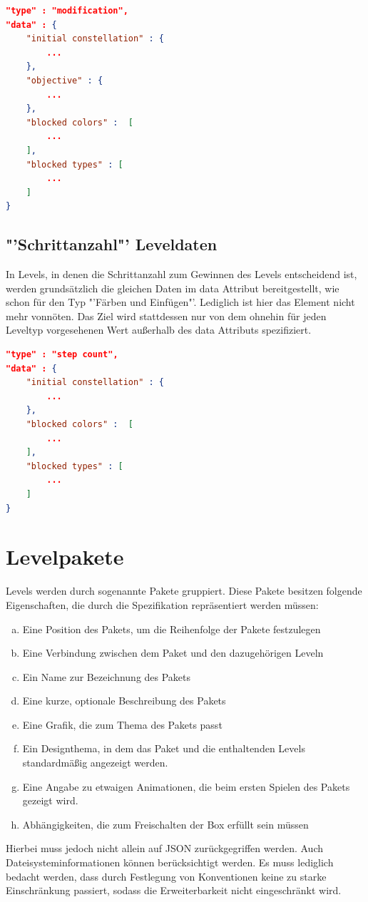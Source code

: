 \begin{lstlisting}[language=json,caption={Grober Aufbau des data Attributs eines "'Färben und Einfügen"' Levels}]
"type" : "modification",
"data" : {
	"initial constellation" : {
		...
	},
	"objective" : {
		...
	},
	"blocked colors" :  [
		...
	],
	"blocked types" : [
		...
	]
}
\end{lstlisting}

\subsection{"'Schrittanzahl"' Leveldaten}
In Levels, in denen die Schrittanzahl zum Gewinnen des Levels entscheidend ist, werden grundsätzlich die gleichen Daten im data Attribut bereitgestellt, wie schon für den Typ "'Färben und Einfügen"'.
Lediglich ist hier das Element  nicht mehr vonnöten.
Das Ziel wird stattdessen nur von dem ohnehin für jeden Leveltyp vorgesehenen Wert  außerhalb des data Attributs spezifiziert.

\begin{lstlisting}[language=json,caption={Grober Aufbau des data Attributs eines "'Schrittzahl"' Levels}]
"type" : "step count",
"data" : {
	"initial constellation" : {
		...
	},
	"blocked colors" :  [
		...
	],
	"blocked types" : [
		...
	]
}
\end{lstlisting}

\section{Levelpakete}
Levels werden durch sogenannte Pakete gruppiert.
Diese Pakete besitzen folgende Eigenschaften, die durch die Spezifikation repräsentiert werden müssen:
\begin{enumerate}[a)]
	\item Eine Position des Pakets, um die Reihenfolge der Pakete festzulegen
	\item Eine Verbindung zwischen dem Paket und den dazugehörigen Leveln
	\item Ein Name zur Bezeichnung des Pakets
	\item Eine kurze, optionale Beschreibung des Pakets
	\item Eine Grafik, die zum Thema des Pakets passt
	\item Ein Designthema, in dem das Paket und die enthaltenden Levels standardmäßig angezeigt werden.
	\item Eine Angabe zu etwaigen Animationen, die beim ersten Spielen des Pakets gezeigt wird.
	\item Abhängigkeiten, die zum Freischalten der Box erfüllt sein müssen
\end{enumerate}
Hierbei muss jedoch nicht allein auf JSON zurückgegriffen werden.
Auch Dateisysteminformationen können berücksichtigt werden.
Es muss lediglich bedacht werden, dass durch Festlegung von Konventionen keine zu starke Einschränkung passiert, sodass die Erweiterbarkeit nicht eingeschränkt wird.

